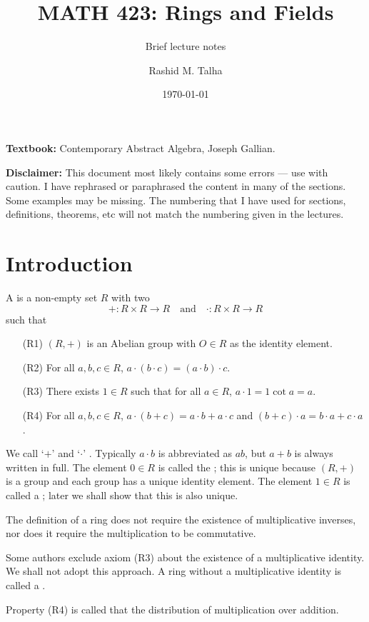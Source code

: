 \documentclass[11pt]{penrose}
\title{MATH 423: Rings and Fields}
\subtitle{Brief lecture notes}
\author{Rashid M. Talha}
\affiliation{School of Natural Sciences, NUST}
\date{\today}
\begin{document}
\maketitle

\textbf{Textbook:} Contemporary Abstract Algebra, Joseph Gallian.

\textbf{Disclaimer:} This document most likely contains some errors --- use with caution. I have rephrased or paraphrased the content in many of the sections. Some examples may be missing. The numbering that I have used for sections, definitions, theorems, etc will not match the numbering given in the lectures.

\section{Introduction}
\begin{ndfn}
    A  is a non-empty set $R$ with two 
    \begin{equation*}
        + : R \times R \to R
        \quad\text{and}\quad
        \cdot : R \times R \to R
    \end{equation*}
    such that
    \begin{enumerate}[label=(\roman*)]
        \item[(R1)] $(R,+)$ is an Abelian group with $O \in R$ as the identity element.
        \item[(R2)] For all $a, b, c \in R$, $a \cdot (b \cdot c) = (a \cdot b) \cdot c$.
        \item[(R3)] There exists $1 \in R$ such that for all $a \in R$, $a \cdot 1 = 1 \cot a = a$.
        \item[(R4)] For all $a, b, c \in R$, $a \cdot (b + c) = a \cdot b + a \cdot c$ and $(b+c) \cdot a = b \cdot a + c \cdot a$.
    \end{enumerate}
\end{ndfn}

\begin{notation}
    We call `$+$'  and `$\cdot$' . Typically $a \cdot b$ is abbreviated as $ab$, but $a+b$ is always written in full. The element $0 \in R$ is called the ; this is unique because $(R,+)$ is a group and each group has a unique identity element. The element $1 \in R$ is called a ; later we shall show that this is also unique.
\end{notation}

\begin{remark}
    The definition of a ring does not require the existence of multiplicative inverses, nor does it require the multiplication to be commutative.

    Some authors exclude axiom (R3) about the existence of a multiplicative identity. We shall not adopt this approach. A ring without a multiplicative identity is called a .

    Property (R4) is called that the distribution of multiplication over addition.
\end{remark}
\end{document}
